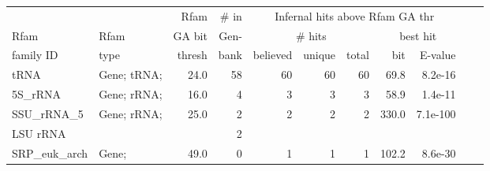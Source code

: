 \begin{footnotesize}
\begin{table}
\label{tbl:results}
\begin{center}  
\begin{tabular}{|l|l|r|r||r|r|r||r|r||r|r||} \hline
                                &                        & Rfam   & \# in  & \multicolumn{5}{c||}{Infernal hits above Rfam GA thr} \\ \cline{5-9}
Rfam                            & Rfam                   & GA bit & Gen-   & \multicolumn{3}{c||}{\# hits}  &  \multicolumn{2}{c||}{best hit} \\ \cline{5-9}
family ID                       & type                   & thresh & bank   & believed & unique   & total  & bit     & E-value  \\ \hline
tRNA                            &  Gene; tRNA;           &  24.0  &     58 &      60  &      60  &     60 &   69.8  &  8.2e-16 \\ 
5S\_rRNA                        &  Gene; rRNA;           &  16.0  &      4 &       3  &       3  &      3 &   58.9  &  1.4e-11 \\
SSU\_rRNA\_5                    &  Gene; rRNA;           &  25.0  &      2 &       2  &       2  &      2 &  330.0  & 7.1e-100 \\
LSU rRNA                        &                        &        &      2 &          &          &        &         &          \\
SRP\_euk\_arch                  &  Gene;                 &  49.0  &     0  &       1  &       1  &      1 &  102.2  &  8.6e-30 \\

\end{tabular}
\end{center}
\end{table}
\end{footnotesize}
